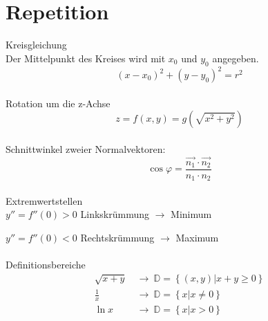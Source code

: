 



\chapter{Repetition}
Kreisgleichung\\
Der Mittelpunkt des Kreises wird mit $x_0$ und $y_0$ angegeben.
\[
	(x-x_{0})^2+(y-y_{0})^2=r^2 
\]	
\\
Rotation um die z-Achse
\[
	z=f(x,y)=g(\sqrt{x^2+y^2})
\]
\\
Schnittwinkel zweier Normalvektoren:
\[
	\cos\varphi=\frac{\overrightarrow{n_1}\cdot \overrightarrow{n_2}}{n_1 \cdot n_2}
\]
\\
Extremwertstellen\\

$ y''=f''(0)>0 $ Linkskrümmung $\rightarrow$ Minimum

$ y''=f''(0)<0 $ Rechtskrümmung $\rightarrow$ Maximum
\\\\
Definitionsbereiche
\[\begin{aligned}
	\sqrt{x+y}\ &\rightarrow \ \mathds{D}=\left\lbrace (x, y) | x + y \geq 0\right\rbrace\\
	\frac1{x}\ &\rightarrow \ \mathds{D}=\left\lbrace x | x \neq 0\right\rbrace\\
	\ln{x}\ &\rightarrow \ \mathds{D}=\left\lbrace x | x > 0\right\rbrace
\end{aligned}\]


